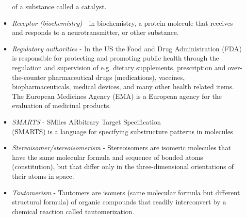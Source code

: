 \documentclass{sig-alternate}
\begin{document}
\begin{itemize}
    of a substance called a catalyst.
\item \textit{Receptor (biochemistry)} - in biochemistry, a protein molecule that receives and responds to a
    neurotransmitter, or other substance.
\item \textit{Regulatory authorities} - In the US the Food and Drug Administration (FDA) is responsible for
    protecting and promoting public health through the regulation and supervision of e.g. dietary supplements,
    prescription and over-the-counter pharmaceutical drugs (medications), vaccines, biopharmaceuticals, medical
    devices, and many other health related items. The European Medicines Agency (EMA) is a European agency for the
    evaluation of medicinal products.
\item \textit{SMARTS} - SMiles ARbitrary Target Specification \\(SMARTS) is a language for specifying substructure
    patterns in molecules
\item \textit{Stereoisomer/stereoisomerism} - Stereoisomers are isomeric molecules that have the same molecular
    formula and sequence of bonded atoms (constitution), but that differ only in the three-dimensional orientations
    of their atoms in space.
\item \textit{Tautomerism} - Tautomers are isomers (same molecular formula but different structural formula) of
    organic compounds that readily interconvert by a chemical reaction called tautomerization.
\end{itemize}
%
\end{document}
